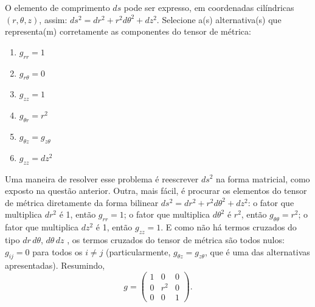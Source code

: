 \begin{question}
    O elemento de comprimento $ds$ pode ser expresso, em coordenadas cilíndricas $(r, \theta, z)$, assim: $ds^2 = dr^2 + r^2 d\theta^2 + dz^2$.
    Selecione a(s) alternativa(s) que representa(m) corretamente as componentes do tensor de métrica:
    \begin{enumerate}
      \item $g_{rr} = 1$ \rightanswer
      \item $g_{r \theta} = 0$ \rightanswer
      \item $g_{zz} = 1$ \rightanswer
      \item $g_{\theta r} = r^2$
      \item $g_{\theta z} = g_{z \theta}$ \rightanswer
      \item $g_{zz} = dz^2$
    \end{enumerate}

    \begin{solution}
      Uma maneira de resolver esse problema é reescrever $ds^2$ na forma matricial, como exposto na questão anterior.
      Outra, mais fácil, é procurar os elementos do tensor de métrica diretamente da forma bilinear $ds^2 = dr^2 + r^2 d\theta^2 + dz^2$:
      o fator que multiplica $dr^2$ é 1, então $g_{rr} = 1$; o fator que multiplica $d\theta^2$ é $r^2$, então $g_{\theta\theta} = r^2$; o fator que multiplica $dz^2$ é 1, então $g_{zz} = 1$.
      E como não há termos cruzados do tipo $dr\,d\theta$, $d\theta\,dz$ \etc, os termos cruzados do tensor de métrica são todos nulos: $g_{ij} = 0$ para todos os $i \ne j$ (particularmente, $g_{\theta z} = g_{z \theta}$, que é uma das alternativas apresentadas).
      Resumindo,
      \begin{equation*}
        g = \begin{pmatrix}
          1 & 0   & 0 \\
          0 & r^2 & 0 \\
          0 & 0   & 1
        \end{pmatrix}.
      \end{equation*}
    \end{solution}
\end{question}